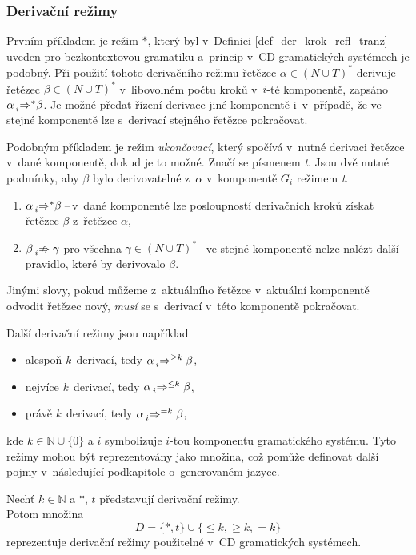 \subsubsection*{Derivační režimy}

Prvním příkladem je režim $*$, který byl v~Definici \ref{def_der_krok_refl_tranz} uveden pro bezkontextovou gramatiku a~princip v~CD gramatických systémech je podobný.
Při použití tohoto derivačního režimu řetězec $\alpha \in (N \cup T)^*$ derivuje řetězec $\beta \in (N \cup T)^*$ v~libovolném počtu kroků v~$i$-té komponentě, zapsáno $\alpha \prescript{}{i}{\Rightarrow}^{*} \beta$.
Je možné předat řízení derivace jiné komponentě i~v~případě, že ve stejné komponentě lze s~derivací stejného řetězce pokračovat.

Podobným příkladem je režim \emph{ukončovací}, který spočívá v~nutné derivaci řetězce v~dané komponentě, dokud je to možné. Značí se písmenem \emph{t}. Jsou dvě nutné podmínky, aby $\beta$ bylo derivovatelné z~$\alpha$ v~komponentě $G_i$ režimem \emph{t}.
\begin{enumerate}
    \item $\alpha \prescript{}{i}{\Rightarrow}^{*} \beta$\,--\,v~dané komponentě lze posloupností derivačních kroků získat řetězec $\beta$ z~řetězce $\alpha$,
    \item $\beta \prescript{}{i}{\nRightarrow}\; \gamma$ pro všechna $\gamma \in (N \cup T)^{*}$\,--\,ve stejné komponentě nelze nalézt další pravidlo, které by derivovalo $\beta$.
\end{enumerate}
Jinými slovy, pokud můžeme z~aktuálního řetězce v~aktuální komponentě odvodit řetězec nový, \emph{musí} se s~derivací v~této komponentě pokračovat. 

Další derivační režimy jsou například
\begin{itemize}
    \item alespoň \emph{k}~derivací, tedy $\alpha \prescript{}{i}{\Rightarrow}^{\geq k}\; \beta$,
    \item nejvíce \emph{k}~derivací, tedy $\alpha \prescript{}{i}{\Rightarrow}^{\leq k}\; \beta$,
    \item právě \emph{k}~derivací, tedy $\alpha \prescript{}{i}{\Rightarrow}^{=k}\; \beta$,
\end{itemize}
kde $k \in \mathbb{N} \cup \{0\}$ a $i$ symbolizuje $i$-tou komponentu gramatického systému.
Tyto režimy mohou být reprezentovány jako množina, což pomůže definovat další pojmy v~následující podkapitole o~generovaném jazyce.
\begin{definition}\label{def_der_rezimy}
    Nechť $k\in \mathbb{N}$ a $*$, $t$ představují derivační režimy. \\
    Potom množina
    \begin{equation*}
        D = \{*, t\} \cup \{\leq k, \geq k, =k\}
    \end{equation*}        
    reprezentuje derivační režimy použitelné v~CD gramatických systémech.
\end{definition}

